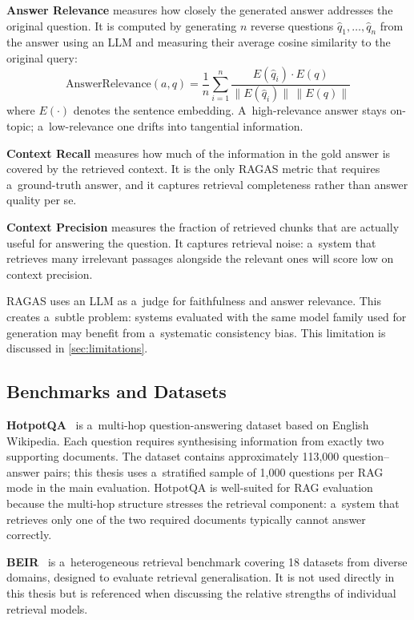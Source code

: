 \textbf{Answer Relevance} measures how closely the generated answer addresses the
original question.
It is computed by generating $n$ reverse questions $\hat{q}_1,\ldots,\hat{q}_n$
from the answer using an LLM and measuring their average cosine similarity to the
original query:
\begin{equation}
  \text{AnswerRelevance}(a, q) =
    \frac{1}{n} \sum_{i=1}^{n}
    \frac{E(\hat{q}_i) \cdot E(q)}{\|E(\hat{q}_i)\|\,\|E(q)\|}
  \label{eq:answerrel}
\end{equation}
where $E(\cdot)$ denotes the sentence embedding.
A~high-relevance answer stays on-topic; a~low-relevance one drifts into tangential
information.

\textbf{Context Recall} measures how much of the information in the gold answer
is covered by the retrieved context.
It is the only RAGAS metric that requires a~ground-truth answer, and it captures
retrieval completeness rather than answer quality per se.

\textbf{Context Precision} measures the fraction of retrieved chunks that are
actually useful for answering the question.
It captures retrieval noise: a~system that retrieves many irrelevant passages alongside
the relevant ones will score low on context precision.

RAGAS uses an LLM as a~judge for faithfulness and answer relevance.
This creates a~subtle problem: systems evaluated with the same model family used for
generation may benefit from a~systematic consistency bias.
This limitation is discussed in \cref{sec:limitations}.

\subsection{Benchmarks and Datasets}
\label{subsec:benchmarks}

\textbf{HotpotQA}~\cite{yang2018hotpotqa} is a~multi-hop question-answering dataset
based on English Wikipedia.
Each question requires synthesising information from exactly two supporting documents.
The dataset contains approximately 113,000 question--answer pairs; this thesis uses
a~stratified sample of 1,000 questions per RAG mode in the main evaluation.
HotpotQA is well-suited for RAG evaluation because the multi-hop structure stresses
the retrieval component: a~system that retrieves only one of the two required documents
typically cannot answer correctly.

\textbf{BEIR}~\cite{thakur2021beir} is a~heterogeneous retrieval benchmark covering
18 datasets from diverse domains, designed to evaluate retrieval generalisation.
It is not used directly in this thesis but is referenced when discussing the
relative strengths of individual retrieval models.


